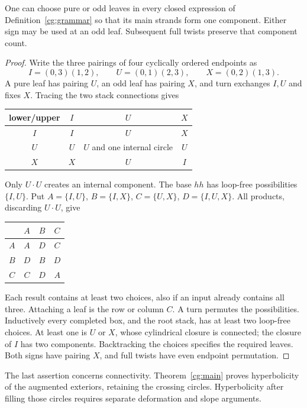 \begin{proposition}\label{cg:knot-choice}
One can choose pure or odd leaves in every closed expression of
Definition~\ref{cg:grammar} so that its main strands form one
component. Either sign may be used at an odd leaf. Subsequent
full twists preserve that component count.
\end{proposition}
\begin{proof}
Write the three pairings of four cyclically ordered endpoints as
\[
 I=(0,3)(1,2),\qquad U=(0,1)(2,3),\qquad X=(0,2)(1,3).
\]
A pure leaf has pairing $U$, an odd leaf has pairing $X$, and
turn exchanges $I,U$ and fixes $X$. Tracing the two stack
connections gives
\begin{center}
\begin{tabular}{c|ccc}
lower/upper & $I$ & $U$ & $X$\\ \hline
$I$ & $I$ & $U$ & $X$\\
$U$ & $U$ & $U$ and one internal circle & $U$\\
$X$ & $X$ & $U$ & $I$
\end{tabular}
\end{center}
Only $U\cdot U$ creates an internal component.
The base $hh$ has loop-free possibilities $\{I,U\}$.
Put $A=\{I,U\}$, $B=\{I,X\}$, $C=\{U,X\}$,
$D=\{I,U,X\}$. All products, discarding $U\cdot U$, give
\begin{center}
\begin{tabular}{c|ccc}
 & $A$ & $B$ & $C$\\ \hline
$A$ & $A$ & $D$ & $C$\\
$B$ & $D$ & $B$ & $D$\\
$C$ & $C$ & $D$ & $A$
\end{tabular}
\end{center}
Each result contains at least two choices, also if an input
already contains all three. Attaching a leaf is the row or column
$C$. A turn permutes the possibilities. Inductively every completed
box, and the root stack, has at least two loop-free choices.
At least one is $U$ or $X$, whose cylindrical closure is connected;
the closure of $I$ has two components. Backtracking the choices
specifies the required leaves. Both signs have pairing $X$,
and full twists have even endpoint permutation.
\end{proof}

The last assertion concerns connectivity. Theorem~\ref{cg:main}
proves hyperbolicity of the augmented exteriors, retaining the
crossing circles. Hyperbolicity after filling those circles
requires separate deformation and slope arguments.


